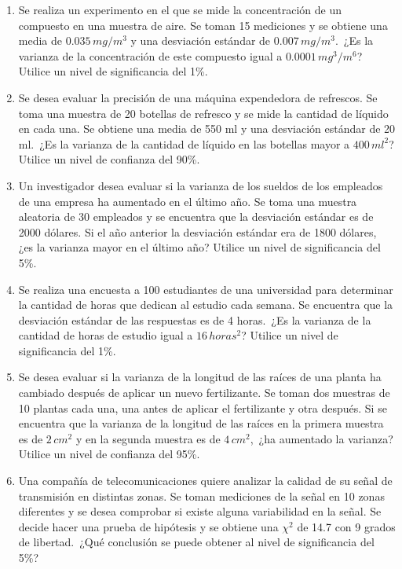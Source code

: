 \begin{Ejer}
\begin{enumerate}
\item Se realiza un experimento en el que se mide la concentraci\'on de un compuesto en una muestra de aire. Se toman 15 mediciones y se obtiene una media de $0.035\, mg/m^3$ y una desviaci\'on est\'andar de $0.007\, mg/m^3$. \,¿Es la varianza de la concentraci\'on de este compuesto igual a $0.0001\, mg^3/m^6$? Utilice un nivel de significancia del 1\%.

\item Se desea evaluar la precisi\'on de una m\'aquina expendedora de refrescos. Se toma una muestra de 20 botellas de refresco y se mide la cantidad de l\'iquido en cada una. Se obtiene una media de 550 ml y una desviaci\'on est\'andar de 20 ml. \,¿Es la varianza de la cantidad de l\'iquido en las botellas mayor a $400\, ml^2$? Utilice un nivel de confianza del 90\%.

\item Un investigador desea evaluar si la varianza de los sueldos de los empleados de una empresa ha aumentado en el \'ultimo a\~no. Se toma una muestra aleatoria de 30 empleados y se encuentra que la desviaci\'on est\'andar es de 2000 d\'olares. Si el a\~no anterior la desviaci\'on est\'andar era de 1800 d\'olares, \,¿es la varianza mayor en el \'ultimo a\~no? Utilice un nivel de significancia del 5\%.

\item Se realiza una encuesta a 100 estudiantes de una universidad para determinar la cantidad de horas que dedican al estudio cada semana. Se encuentra que la desviaci\'on est\'andar de las respuestas es de 4 horas. \,¿Es la varianza de la cantidad de horas de estudio igual a $16\, horas^2$? Utilice un nivel de significancia del 1\%.

\item Se desea evaluar si la varianza de la longitud de las ra\'ices de una planta ha cambiado despu\'es de aplicar un nuevo fertilizante. Se toman dos muestras de 10 plantas cada una, una antes de aplicar el fertilizante y otra despu\'es. Si se encuentra que la varianza de la longitud de las ra\'ices en la primera muestra es de $2\, cm^2$ y en la segunda muestra es de $4\, cm^2$, \,¿ha aumentado la varianza? Utilice un nivel de confianza del 95\%.

\item Una compa\~n\'ia de telecomunicaciones quiere analizar la calidad de su se\~nal de transmisi\'on en distintas zonas. Se toman mediciones de la se\~nal en 10 zonas diferentes y se desea comprobar si existe alguna variabilidad en la se\~nal. Se decide hacer una prueba de hip\'otesis y se obtiene una $\chi^2$ de 14.7 con 9 grados de libertad. \,¿Qu\'e conclusi\'on se puede obtener al nivel de significancia del 5\%?


\end{enumerate}
\end{Ejer}
